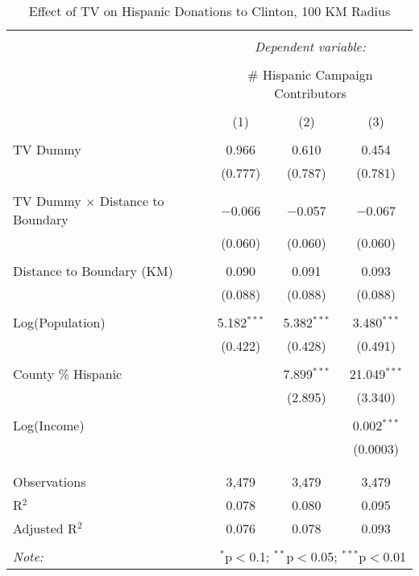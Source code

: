 
\begin{table}[!htbp] \centering 
  \caption{Effect of TV on Hispanic Donations to Clinton, 100 KM Radius} 
  \label{} 
\begin{tabular}{@{\extracolsep{-5pt}}lccc} 
\\[-1.8ex]\hline 
\hline \\[-1.8ex] 
 & \multicolumn{3}{c}{\textit{Dependent variable:}} \\ 
\cline{2-4} 
\\[-1.8ex] & \multicolumn{3}{c}{\# Hispanic Campaign Contributors} \\ 
\\[-1.8ex] & (1) & (2) & (3)\\ 
\hline \\[-1.8ex] 
 TV Dummy & 0.966 & 0.610 & 0.454 \\ 
  & (0.777) & (0.787) & (0.781) \\ 
  & & & \\ 
 TV Dummy $\times$ Distance to Boundary  & $-$0.066 & $-$0.057 & $-$0.067 \\ 
  & (0.060) & (0.060) & (0.060) \\ 
  & & & \\ 
 Distance to Boundary (KM) & 0.090 & 0.091 & 0.093 \\ 
  & (0.088) & (0.088) & (0.088) \\ 
  & & & \\ 
 Log(Population) & 5.182$^{***}$ & 5.382$^{***}$ & 3.480$^{***}$ \\ 
  & (0.422) & (0.428) & (0.491) \\ 
  & & & \\ 
 County \% Hispanic &  & 7.899$^{***}$ & 21.049$^{***}$ \\ 
  &  & (2.895) & (3.340) \\ 
  & & & \\ 
 Log(Income) &  &  & 0.002$^{***}$ \\ 
  &  &  & (0.0003) \\ 
  & & & \\ 
\hline \\[-1.8ex] 
Observations & 3,479 & 3,479 & 3,479 \\ 
R$^{2}$ & 0.078 & 0.080 & 0.095 \\ 
Adjusted R$^{2}$ & 0.076 & 0.078 & 0.093 \\ 
\hline 
\hline \\[-1.8ex] 
\textit{Note:}  & \multicolumn{3}{r}{$^{*}$p$<$0.1; $^{**}$p$<$0.05; $^{***}$p$<$0.01} \\ 
\end{tabular} 
\end{table} 
